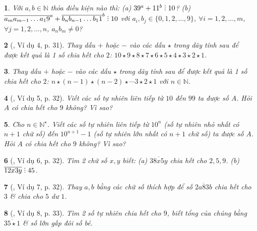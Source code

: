 \documentclass{article}
\newtheorem{baitoan}{}
\DeclareRobustCommand{\divby}{%
	\mathrel{\vbox{\baselineskip.65ex\lineskiplimit0pt\hbox{.}\hbox{.}\hbox{.}}}%
}
\begin{document}
\begin{baitoan}
	Với $a,b\in\mathbb{N}$ thỏa điều kiện nào thì: (a) $39^a + 11^b\divby10$? (b) $\overline{a_ma_{m-1}\ldots a_19}^a + \overline{b_nb_{n-1}\ldots b_11}^b\divby10$ với $a_i,b_j\in\{0,1,2,\ldots,9\}$, $\forall i = 1,2,\ldots,m$, $\forall j = 1,2,\ldots,n$, $a_nb_m\ne0$?
\end{baitoan}

\begin{baitoan}[\cite{Binh_boi_duong_Toan_6_tap_1}, Ví dụ 4, p. 31]
	Thay dấu $+$ hoặc $-$ vào các dấu $\star$ trong dãy tính sau để được kết quả là 1 số chia hết cho $2$: $10\star9\star8\star7\star6\star5\star4\star3\star2\star1$.
\end{baitoan}

\begin{baitoan}
	Thay dấu $+$ hoặc $-$ vào các dấu $\star$ trong dãy tính sau để được kết quả là 1 số chia hết cho $2$: $n\star(n - 1)\star(n - 2)\star\cdots3\star2\star1$ với $n\in\mathbb{N}$.
\end{baitoan}

\begin{baitoan}[\cite{Binh_boi_duong_Toan_6_tap_1}, Ví dụ 5, p. 32]
	Viết các số tự nhiên liên tiếp từ $10$ đến $99$ ta được số $A$. Hỏi $A$ có chia hết cho $9$ không? Vì sao?
\end{baitoan}

\begin{baitoan}
	Cho $n\in\mathbb{N}^\star$. Viết các số tự nhiên liên tiếp từ $10^n$ (số tự nhiên nhỏ nhất có $n + 1$ chữ số) đến $10^{n+1} - 1$ (số tự nhiên lớn nhất có $n + 1$ chữ số) ta được số $A$. Hỏi $A$ có chia hết cho $9$ không? Vì sao?
\end{baitoan}

\begin{baitoan}[\cite{Binh_boi_duong_Toan_6_tap_1}, Ví dụ 6, p. 32]
	Tìm 2 chữ số $x,y$ biết: (a) $\overline{38x5y}$ chia hết cho $2,5,9$. (b) $\overline{12x3y}\divby45$.
\end{baitoan}

\begin{baitoan}[\cite{Binh_boi_duong_Toan_6_tap_1}, Ví dụ 7, p. 32]
	Thay $a,b$ bằng các chữ số thích hợp để số $ \overline{2a83b}$ chia hết cho $3$ \& chia cho $5$ dư $1$.
\end{baitoan}

\begin{baitoan}[\cite{Binh_boi_duong_Toan_6_tap_1}, Ví dụ 8, p. 33]
	Tìm 2 số tự nhiên chia hết cho $9$, biết tổng của chúng bằng $\overline{35\star1}$ \& số lớn gấp đôi số bé.
\end{baitoan}
\end{document}
